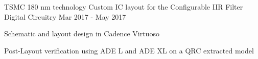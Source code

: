 \begin{cventries}

\cventry
{TSMC 180 nm technology} %
{Custom IC layout for the Configurable IIR Filter} %
{Digital Circuitry} %
{Mar 2017 - May 2017} %
{ %
\begin{cvitems}
\item {Schematic and layout design in Cadence Virtuoso}
\item {Post-Layout verification using ADE L and ADE XL on a QRC extracted model}
\end{cvitems}
}



\end{cventries}